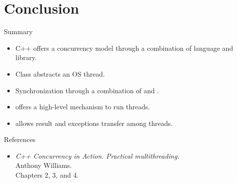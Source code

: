 \section{Conclusion}

\begin{frame}[t]{Summary}
\begin{itemize}
  \item C++ offers a concurrency model through a combination of
        language and library.
  \item Class  abstracts an OS thread.
  \item Synchronization through a combination of  and .
  \item {} offers a high-level mechanism to run threads.
  \item {} allows result and exceptions transfer among threads.
\end{itemize}
\end{frame}

\begin{frame}[t]{References}
\begin{itemize}
  \item \emph{C++ Concurrency in Action. Practical multithreading.}\\
  Anthony Williams.\\
  Chapters 2, 3, and 4.
\end{itemize}
\end{frame}
